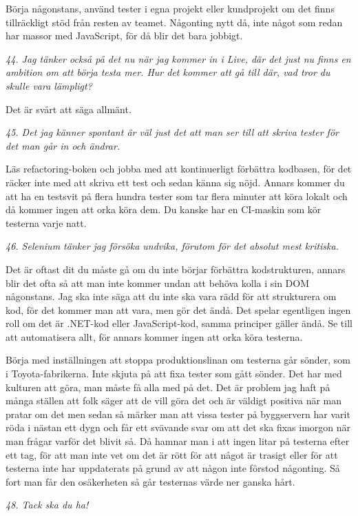 \documentclass[11pt]{article}
\begin{document}
Börja någonstans, använd tester i egna projekt eller kundprojekt om det finns tillräckligt stöd från resten av teamet. Någonting nytt då, inte något som redan har massor med JavaScript, för då blir det bara jobbigt.

\emph{44. Jag tänker också på det nu när jag kommer in i Live, där det just nu finns en ambition om att börja testa mer. Hur det kommer att gå till där, vad tror du skulle vara lämpligt?}

Det är svårt att säga allmänt.

\emph{45. Det jag känner spontant är väl just det att man ser till att skriva tester för det man går in och ändrar.}

Läs refactoring-boken och jobba med att kontinuerligt förbättra kodbasen, för det räcker inte med att skriva ett test och sedan känna sig nöjd. Annars kommer du att ha en testsvit på flera hundra tester som tar flera minuter att köra lokalt och då kommer ingen att orka köra dem. Du kanske har en CI-maskin som kör testerna varje natt.

\emph{46. Selenium tänker jag försöka undvika, förutom för det absolut mest kritiska.}

Det är oftast dit du måste gå om du inte börjar förbättra kodstrukturen, annars blir det ofta så att man inte kommer undan att behöva kolla i sin DOM någonstans. Jag ska inte säga att du inte ska vara rädd för att strukturera om kod, för det kommer man att vara, men gör det ändå. Det spelar egentligen ingen roll om det är .NET-kod eller JavaScript-kod, samma principer gäller ändå. Se till att automatisera allt, för annars kommer ingen att orka köra testerna.

Börja med inställningen att stoppa produktionslinan om testerna går sönder, som i Toyota-fabrikerna. Inte skjuta på att fixa tester som gått sönder. Det har med kulturen att göra, man måste få alla med på det. Det är problem jag haft på många ställen att folk säger att de vill göra det och är väldigt positiva när man pratar om det men sedan så märker man att vissa tester på byggservern har varit röda i nästan ett dygn och får ett svävande svar om att det ska fixas imorgon när man frågar varför det blivit så. Då hamnar man i att ingen litar på testerna efter ett tag, för att man inte vet om det är rött för att något är trasigt eller för att testerna inte har uppdaterats på grund av att någon inte förstod någonting. Så fort man får den osäkerheten så går testernas värde ner ganska hårt.

\emph{48. Tack ska du ha!}
\end{document}
